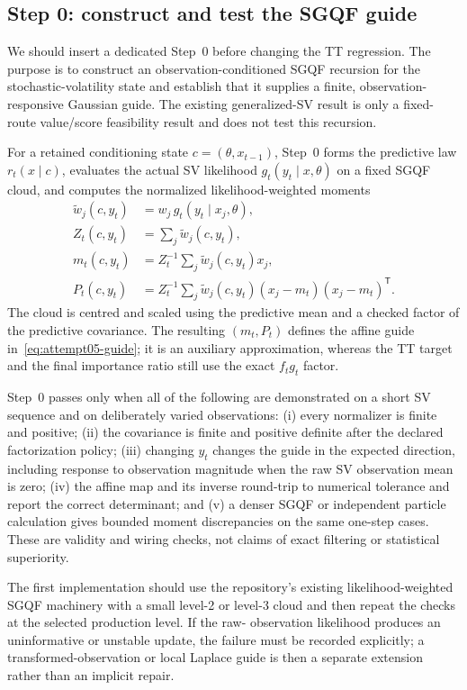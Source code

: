 \documentclass[11pt]{article}
\begin{document}
\subsection{Step 0: construct and test the SGQF guide}
\label{sec:step-zero-sgqf}

We should insert a dedicated Step~0 before changing the TT regression.  The
purpose is to construct an observation-conditioned SGQF recursion for the
stochastic-volatility state and establish that it supplies a finite,
observation-responsive Gaussian guide.  The existing generalized-SV result is
only a fixed-route value/score feasibility result and does not test this
recursion.

For a retained conditioning state $c=(\theta,x_{t-1})$, Step~0 forms the
predictive law $r_t(x\mid c)$, evaluates the actual SV likelihood
$g_t(y_t\mid x,\theta)$ on a fixed SGQF cloud, and computes the normalized
likelihood-weighted moments
\begin{align}
  \widetilde w_j(c,y_t)&=w_j\,g_t(y_t\mid x_j,\theta),\\
  Z_t(c,y_t)&=\sum_j\widetilde w_j(c,y_t),\\
  m_t(c,y_t)&=Z_t^{-1}\sum_j\widetilde w_j(c,y_t)x_j,\\
  P_t(c,y_t)&=Z_t^{-1}\sum_j\widetilde w_j(c,y_t)
       (x_j-m_t)(x_j-m_t)^\mathsf{T}.
  \label{eq:step-zero-sgqf-moments}
\end{align}
The cloud is centred and scaled using the predictive mean and a checked
factor of the predictive covariance.  The resulting $(m_t,P_t)$ defines the
affine guide in~\eqref{eq:attempt05-guide}; it is an auxiliary approximation,
whereas the TT target and the final importance ratio still use the exact
$f_tg_t$ factor.

Step~0 passes only when all of the following are demonstrated on a short
SV sequence and on deliberately varied observations: (i) every normalizer is
finite and positive; (ii) the covariance is finite and positive definite
after the declared factorization policy; (iii) changing $y_t$ changes the
guide in the expected direction, including response to observation magnitude
when the raw SV observation mean is zero; (iv) the affine map and its inverse
round-trip to numerical tolerance and report the correct determinant; and (v)
a denser SGQF or independent particle calculation gives bounded moment
discrepancies on the same one-step cases.  These are validity and wiring
checks, not claims of exact filtering or statistical superiority.

The first implementation should use the repository's existing
likelihood-weighted SGQF machinery with a small level-2 or level-3 cloud and
then repeat the checks at the selected production level.  If the raw-
observation likelihood produces an uninformative or unstable update, the
failure must be recorded explicitly; a transformed-observation or local
Laplace guide is then a separate extension rather than an implicit repair.
\end{document}
